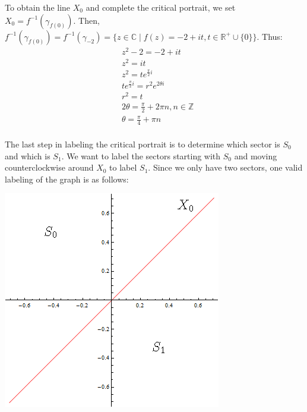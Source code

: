 \documentclass[11pt]{amsart}
\theoremstyle{definition}
\theoremstyle{remark}
\numberwithin{equation}{section}
\begin{document}
\indent To obtain the line $X_0$ and complete the critical portrait, we set $X_0 = f^{-1}(\gamma_{f(0)})$. Then, $f^{-1}(\gamma_{f(0)}) = f^{-1}(\gamma_{-2}) = \{z \in \mathbb{C} \mid f(z) = -2 + it, t \in \mathbb{R^+} \cup \{0\} \}$. Thus:
\begin{align*}
& z^2 - 2 = -2 + it\\
& z^2 = it\\
& z^2 = te^{\frac{\pi}{2}i}\\
& te^{\frac{\pi}{2}i} = r^2e^{2\theta i}\\
& r^2 = t\\
& 2\theta = \frac{\pi}{2} + 2\pi n, n \in \mathbb{Z}\\
& \theta = \frac{\pi}{4} + \pi n\\
\end{align*}

\indent The last step in labeling the critical portrait is to determine which sector is $S_0$ and which is $S_1$. We want to label the sectors starting with $S_0$ and moving counterclockwise around $X_0$ to label $S_1$. Since we only have two sectors, one valid labeling of the graph is as follows:\\

\begin{center}
\includegraphics[scale=0.5]{z2minus2criticalportrait.png}
\end{center}
\end{document}
